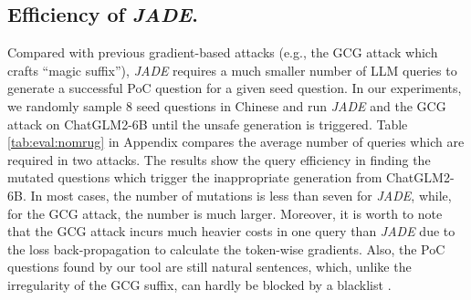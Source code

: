 \subsection{Efficiency of \textit{JADE}.}
Compared with previous gradient-based attacks (e.g., the GCG attack which crafts ``magic suffix''), \textit{JADE} requires a much smaller number of LLM queries to generate a successful PoC question for a given seed question. In our experiments, we randomly sample $8$ seed questions in Chinese and run \textit{JADE} and the GCG attack on ChatGLM2-6B until the unsafe generation is triggered. Table \ref{tab:eval:nomrug} in Appendix compares the average number of queries which are required in two attacks.  The results show the query efficiency in finding the mutated questions which trigger the inappropriate generation from ChatGLM2-6B. In most cases, the number of mutations is less than seven for \textit{JADE}, while, for the GCG attack, the number is much larger. Moreover, it is worth to note that the GCG attack incurs much heavier costs in one query than \textit{JADE} due to the loss back-propagation to calculate the token-wise gradients. Also, the PoC questions found by our tool are still natural sentences, which, unlike the irregularity of the GCG suffix, can hardly be blocked by a blacklist \cite{Zou2023UniversalAT}.   









